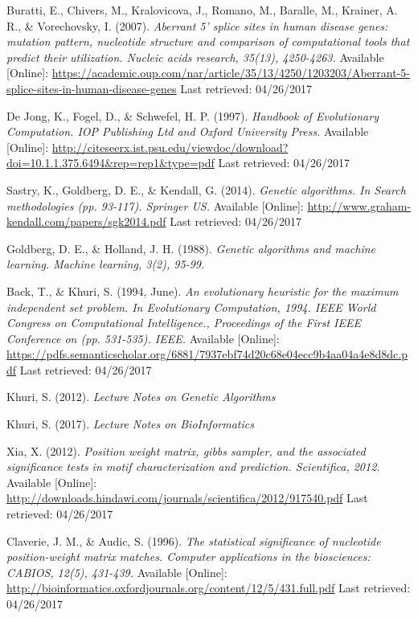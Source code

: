 \documentclass[12pt,a4paper]{article}
\begin{document}
\begin{thebibliography}{9}
		Buratti, E., Chivers, M., Kralovicova, J., Romano, M., Baralle, M., Krainer, A. R., \& Vorechovsky, I. (2007). 
		\textit{Aberrant 5' splice sites in human disease genes: mutation pattern, nucleotide structure and comparison of computational tools that predict their utilization. Nucleic acids research, 35(13), 4250-4263.}
		Available [Online]: \url{https://academic.oup.com/nar/article/35/13/4250/1203203/Aberrant-5-splice-sites-in-human-disease-genes}
		Last retrieved: 04/26/2017

		De Jong, K., Fogel, D., \& Schwefel, H. P. (1997). 
		\textit{Handbook of Evolutionary Computation. IOP Publishing Ltd and Oxford University Press.}
		Available [Online]: \url{http://citeseerx.ist.psu.edu/viewdoc/download?doi=10.1.1.375.6494&rep=rep1&type=pdf}
		Last retrieved: 04/26/2017

		Sastry, K., Goldberg, D. E., \& Kendall, G. (2014).
		\textit{ Genetic algorithms. In Search methodologies (pp. 93-117). Springer US.}
		Available [Online]: \url{http://www.graham-kendall.com/papers/sgk2014.pdf}
		Last retrieved: 04/26/2017
		
		Goldberg, D. E., \& Holland, J. H. (1988). 
		\textit{Genetic algorithms and machine learning. Machine learning, 3(2), 95-99.}

		Back, T., \& Khuri, S. (1994, June). 
		\textit{ An evolutionary heuristic for the maximum independent set problem. In Evolutionary Computation, 1994. IEEE World Congress on Computational Intelligence., Proceedings of the First IEEE Conference on (pp. 531-535). IEEE.}
		Available [Online]: \url{https://pdfs.semanticscholar.org/6881/7937ebf74d20c68e04ecc9b4aa04a4e8d8dc.pdf}
		Last retrieved: 04/26/2017

		Khuri, S. (2012). 
		\textit{ Lecture Notes on Genetic Algorithms }

		Khuri, S. (2017). 
		\textit{ Lecture Notes on BioInformatics }	    

		Xia, X. (2012).
		\textit{ Position weight matrix, gibbs sampler, and the associated significance tests in motif characterization and prediction. Scientifica, 2012.}
		Available [Online]: \url{http://downloads.hindawi.com/journals/scientifica/2012/917540.pdf} Last retrieved: 04/26/2017
		
		Claverie, J. M., \& Audic, S. (1996).
		\textit{The statistical significance of nucleotide position-weight matrix matches. Computer applications in the biosciences: CABIOS, 12(5), 431-439.}
		Available [Online]: \url{http://bioinformatics.oxfordjournals.org/content/12/5/431.full.pdf} Last retrieved: 04/26/2017
	    

\end{thebibliography}
\end{document}
